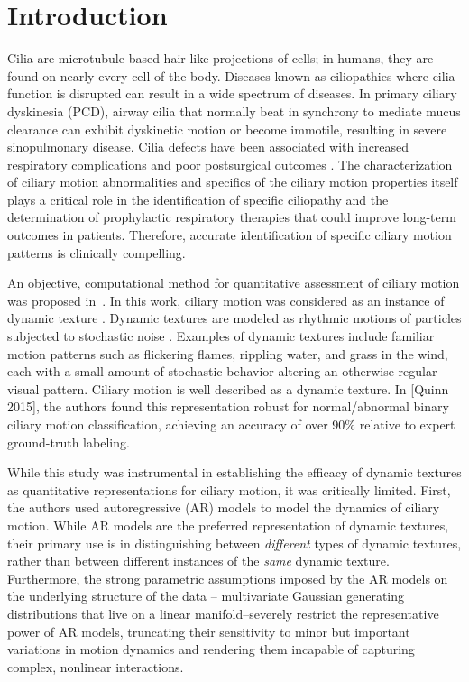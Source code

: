 \section{Introduction}

Cilia are microtubule-based hair-like projections of cells; in humans, they are found on nearly every cell of the body. Diseases known as ciliopathies where cilia function is disrupted can result in a wide spectrum of diseases. In primary ciliary dyskinesia (PCD), airway cilia that normally beat in synchrony to mediate mucus clearance can exhibit dyskinetic motion or become immotile, resulting in severe sinopulmonary disease\cite{o2007diagnosing}. Cilia defects have been associated with increased respiratory complications and poor postsurgical outcomes \cite{nakhleh2012high}. The characterization of ciliary motion abnormalities and specifics of the ciliary motion properties itself plays a critical role in the identification of specific ciliopathy and the determination of prophylactic respiratory therapies that could improve long-term outcomes in patients. Therefore, accurate identification of specific ciliary motion patterns is clinically compelling.

An objective, computational method for quantitative assessment of ciliary motion was proposed in~\cite{quinn2015automated}. In this work, ciliary motion was considered as an instance of dynamic texture \cite{saisan2001dynamic}. Dynamic textures are modeled as rhythmic motions of particles subjected to stochastic noise \cite{chen2013automatic}. Examples of dynamic textures include familiar motion patterns such as flickering flames, rippling water, and grass in the wind, each with a small amount of stochastic behavior altering an otherwise regular visual pattern. Ciliary motion is well described as a dynamic texture. In [Quinn 2015], the authors found this representation robust for normal/abnormal binary ciliary motion classification, achieving an accuracy of over 90\% relative to expert ground-truth labeling.

While this study was instrumental in establishing the efficacy of dynamic textures as quantitative representations for ciliary motion, it was critically limited. First, the authors used autoregressive (AR) models \cite{hyndman2007higher} to model the dynamics of ciliary motion. While AR models are the preferred representation of dynamic textures, their primary use is in distinguishing between \textit{different} types of dynamic textures, rather than between different instances of the \textit{same} dynamic texture. Furthermore, the strong parametric assumptions imposed by the AR models on the underlying structure of the data -- multivariate Gaussian generating distributions that live on a linear manifold--severely restrict the representative power of AR models, truncating their sensitivity to minor but important variations in motion dynamics and rendering them incapable of capturing complex, nonlinear interactions.

